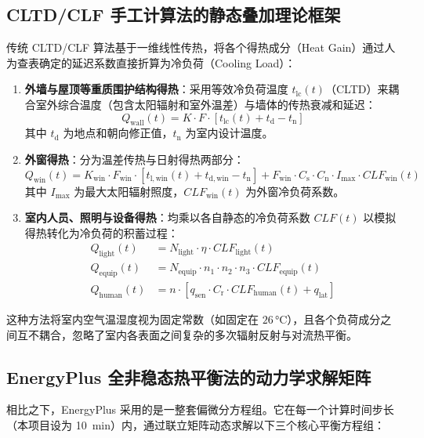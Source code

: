 \documentclass[11pt,a4paper]{article}
\begin{document}
\subsection{CLTD/CLF 手工计算法的静态叠加理论框架}
传统 CLTD/CLF 算法基于一维线性传热，将各个得热成分（Heat Gain）通过人为查表确定的延迟系数直接折算为冷负荷（Cooling Load）：
\begin{enumerate}
    \item \textbf{外墙与屋顶等重质围护结构得热}：采用等效冷负荷温度 $t_{\mathrm{lc}}(t)$（CLTD）来耦合室外综合温度（包含太阳辐射和室外温差）与墙体的传热衰减和延迟：
    \begin{equation}
        Q_{\mathrm{wall}}(t) = K \cdot F \cdot [t_{\mathrm{lc}}(t) + t_{\mathrm{d}} - t_{\mathrm{n}}]
    \end{equation}
    其中 $t_{\mathrm{d}}$ 为地点和朝向修正值，$t_{\mathrm{n}}$ 为室内设计温度。
    
    \item \textbf{外窗得热}：分为温差传热与日射得热两部分：
    \begin{equation}
        Q_{\mathrm{win}}(t) = K_{\mathrm{win}} \cdot F_{\mathrm{win}} \cdot [t_{\mathrm{l,win}}(t) + t_{\mathrm{d,win}} - t_{\mathrm{n}}] + F_{\mathrm{win}} \cdot C_{\mathrm{s}} \cdot C_{\mathrm{n}} \cdot I_{\mathrm{max}} \cdot CLF_{\mathrm{win}}(t)
    \end{equation}
    其中 $I_{\mathrm{max}}$ 为最大太阳辐射照度，$CLF_{\mathrm{win}}(t)$ 为外窗冷负荷系数。
    
    \item \textbf{室内人员、照明与设备得热}：均乘以各自静态的冷负荷系数 $CLF(t)$ 以模拟得热转化为冷负荷的积蓄过程：
    \begin{align}
        Q_{\mathrm{light}}(t) &= N_{\mathrm{light}} \cdot \eta \cdot CLF_{\mathrm{light}}(t) \\
        Q_{\mathrm{equip}}(t) &= N_{\mathrm{equip}} \cdot n_1 \cdot n_2 \cdot n_3 \cdot CLF_{\mathrm{equip}}(t) \\
        Q_{\mathrm{human}}(t) &= n \cdot [q_{\mathrm{sen}} \cdot C_{\mathrm{r}} \cdot CLF_{\mathrm{human}}(t) + q_{\mathrm{lat}}]
    \end{align}
\end{enumerate}
这种方法将室内空气温湿度视为固定常数（如固定在 $26\,\si{\degreeCelsius}$），且各个负荷成分之间互不耦合，忽略了室内各表面之间复杂的多次辐射反射与对流热平衡。

\subsection{EnergyPlus 全非稳态热平衡法的动力学求解矩阵}
相比之下，EnergyPlus 采用的是一整套偏微分方程组。它在每一个计算时间步长（本项目设为 \SI{10}{min}）内，通过联立矩阵动态求解以下三个核心平衡方程组：
\end{document}
